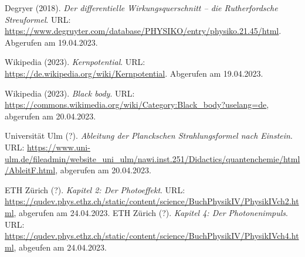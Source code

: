 \begin{thebibliography}{99}
     Degryer (2018). \emph{Der differentielle Wirkungsquerschnitt – die Rutherfordsche Streuformel}. URL: \url{https://www.degruyter.com/database/PHYSIKO/entry/physiko.21.45/html}. Abgerufen am 19.04.2023. 

     Wikipedia (2023). \emph{Kernpotential}. URL: \url{https://de.wikipedia.org/wiki/Kernpotential}. Abgerufen am 19.04.2023. 

     Wikipedia (2023). \emph{Black body}. URL: \url{https://commons.wikimedia.org/wiki/Category:Black_body?uselang=de}, abgerufen am 20.04.2023.

     Universität Ulm (?). \emph{Ableitung der Planckschen Strahlungsformel nach Einstein}. URL: \url{https://www.uni-ulm.de/fileadmin/website_uni_ulm/nawi.inst.251/Didactics/quantenchemie/html/AbleitF.html}, abgerufen am 20.04.2023.

     ETH Zürich (?). \emph{Kapitel 2: Der Photoeffekt}. URL: \url{https://qudev.phys.ethz.ch/static/content/science/BuchPhysikIV/PhysikIVch2.html}, abgerufen am 24.04.2023.
     ETH Zürich (?). \emph{Kapitel 4: Der Photonenimpuls}. URL: \url{https://qudev.phys.ethz.ch/static/content/science/BuchPhysikIV/PhysikIVch4.html}, abgeufen am 24.04.2023.  
\end{thebibliography}